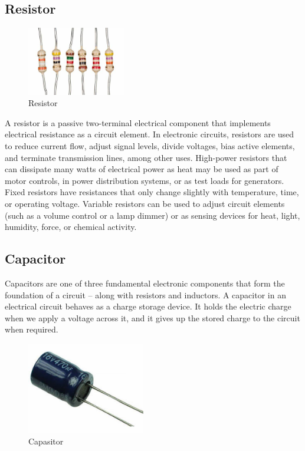 \documentclass[conference]{IEEEtran}
\begin{document}
\subsection{Resistor}
\begin{figure}[h]
    \centering
    \includegraphics[height=3cm,width=\linewidth]{images/Resistor.jpg}
    \caption{Resistor}
    \label{fig:enter-label}
\end{figure}
A resistor is a passive two-terminal electrical component that implements electrical resistance as a circuit element. In electronic circuits, resistors are used to reduce current flow, adjust signal levels, divide voltages, bias active elements, and terminate transmission lines, among other uses. High-power resistors that can dissipate many watts of electrical power as heat may be used as part of motor controls, in power distribution systems, or as test loads for generators. Fixed resistors have resistances that only change slightly with temperature, time, or operating voltage. Variable resistors can be used to adjust circuit elements (such as a volume control or a lamp dimmer) or as sensing devices for heat, light, humidity, force, or chemical activity.


\subsection{Capacitor}

Capacitors are one of three fundamental electronic components that form the foundation of a circuit – along with resistors and inductors. A capacitor in an electrical circuit behaves as a charge storage device. It holds the electric charge when we apply a voltage across it, and it gives up the stored charge to the circuit when required.
\begin{figure}[th]
    \centering
    \includegraphics[height=4cm,width=\linewidth]{images/capasitor.jpg}
    \caption{Capasitor}
    \label{fig:enter-label}
\end{figure}
\end{document}

